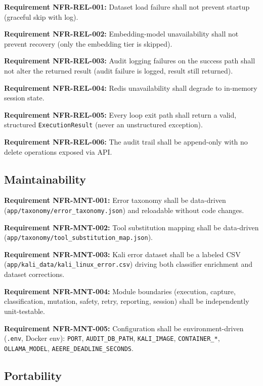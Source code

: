 \documentclass[10pt,journal,onecolumn]{IEEEtran}
\newcommand{\reqid}[1]{\textbf{#1}}
\begin{document}
\reqid{Requirement NFR-REL-001:} Dataset load failure shall not prevent startup (graceful skip with log).

\reqid{Requirement NFR-REL-002:} Embedding-model unavailability shall not prevent recovery (only the embedding tier is skipped).

\reqid{Requirement NFR-REL-003:} Audit logging failures on the success path shall not alter the returned result (audit failure is logged, result still returned).

\reqid{Requirement NFR-REL-004:} Redis unavailability shall degrade to in-memory session state.

\reqid{Requirement NFR-REL-005:} Every loop exit path shall return a valid, structured \texttt{ExecutionResult} (never an unstructured exception).

\reqid{Requirement NFR-REL-006:} The audit trail shall be append-only with no delete operations exposed via API.

\subsection{Maintainability}

\reqid{Requirement NFR-MNT-001:} Error taxonomy shall be data-driven (\texttt{app/\allowbreak taxonomy/\allowbreak error\_\allowbreak taxonomy.\allowbreak json}) and reloadable without code changes.

\reqid{Requirement NFR-MNT-002:} Tool substitution mapping shall be data-driven (\texttt{app/\allowbreak taxonomy/\allowbreak tool\_\allowbreak substitution\_\allowbreak map.\allowbreak json}).

\reqid{Requirement NFR-MNT-003:} Kali error dataset shall be a labeled CSV (\texttt{app/\allowbreak kali\_\allowbreak data/\allowbreak kali\_\allowbreak linux\_\allowbreak error.\allowbreak csv}) driving both classifier enrichment and dataset corrections.

\reqid{Requirement NFR-MNT-004:} Module boundaries (execution, capture, classification, mutation, safety, retry, reporting, session) shall be independently unit-testable.

\reqid{Requirement NFR-MNT-005:} Configuration shall be environment-driven (\texttt{.env}, Docker env): \texttt{PORT}, \texttt{AUDIT\_DB\_PATH}, \texttt{KALI\_IMAGE}, \texttt{CONTAINER\_*}, \texttt{OLLAMA\_MODEL}, \texttt{AEERE\_DEADLINE\_SECONDS}.

\subsection{Portability}
\end{document}
